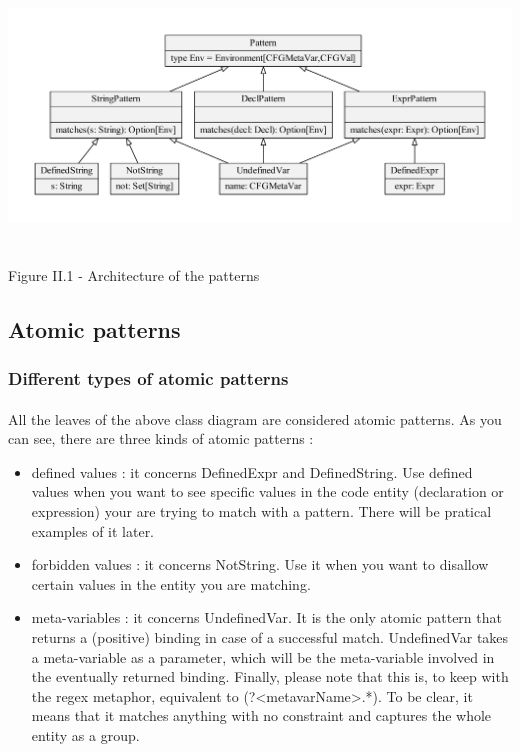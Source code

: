 \documentclass{report}
\begin{document}
\begin{center}
\includegraphics[scale=0.6]{data/patterns}
~\\~\\Figure II.1 - Architecture of the patterns
\end{center}

\subsection{Atomic patterns}

\subsubsection{Different types of atomic patterns}

\paragraph{}
\hspace{4mm}All the leaves of the above class diagram are considered atomic patterns. As you can see, there are three kinds of atomic patterns :

\vspace{1.5mm}
\begin{itemize}
\item defined values : it concerns DefinedExpr and DefinedString. Use defined values when you want to see specific values in the code entity (declaration or expression) your are trying to match with a pattern. There will be pratical examples of it later.\vspace{1mm}
\item forbidden values : it concerns NotString. Use it when you want to disallow certain values in the entity you are matching.\vspace{1mm}
\item meta-variables : it concerns UndefinedVar. It is the only atomic pattern that returns a (positive) binding in case of a successful match. UndefinedVar takes a meta-variable as a parameter, 
which will be the meta-variable involved in the eventually returned binding. Finally, please note that this is, to keep with the regex metaphor, equivalent to (?<metavarName>.*). To be clear, it means that it matches
anything with no constraint and captures the whole entity as a group.\vspace{1mm}
\end{itemize}
\end{document}
